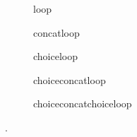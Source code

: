 \documentclass[10pt,letterpaper]{article}
\begin{document}
\begin{figure}
  \centerline{\usebox{\loopBox}}
  \caption{loop}
  \label{fig:loop}
\end{figure}


\begin{figure}
  \centerline{\usebox{\concatloopBox}}
  \caption{concatloop}
  \label{fig:concatloop}
\end{figure}


\begin{figure}
  \centerline{\usebox{\choiceloopBox}}
  \caption{choiceloop}
  \label{fig:choiceloop}
\end{figure}

\begin{figure}
  \centerline{\usebox{\choiceconcatloopBox}}
  \caption{choiceconcatloop}
  \label{fig:choiceconcatloop}
\end{figure}

\begin{figure}
  \centerline{\usebox{\choiceconcatchoiceloopBox}}
  \caption{choiceconcatchoiceloop}
  \label{fig:choiceconcatchoiceloop}
\end{figure}

.
    
    

\immediate\closeout\tempfile
\end{document}
